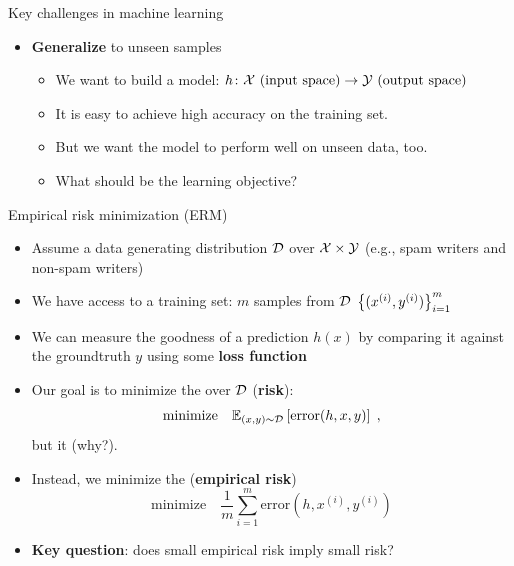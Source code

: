 \documentclass[usenames,dvipsnames,notes,11pt,aspectratio=169]{beamer}
\begin{document}
\begin{frame}
    {Key challenges in machine learning}
    \begin{itemize}
        \item \textbf{Generalize} to unseen samples
            \begin{itemize}
                \item We want to build a model: $h\colon \mathcal{X} \text{ (input space)} \rightarrow \mathcal{Y} \text{ (output space)}$
                \item It is easy to achieve high accuracy on the training set.
                \item But we want the model to perform well on unseen data, too.
                \item What should be the learning objective? 
            \end{itemize}
    \end{itemize}
\end{frame}

\begin{frame}
    {Empirical risk minimization (ERM)}

    \begin{itemize}[<+->]
        \item Assume a data generating distribution $\mathcal{D}$ over $\mathcal{X}\times\mathcal{Y}$ (e.g., spam writers and non-spam writers)
        \item We have access to a training set: $m$ samples from $\mathcal{D}$ $\left\{ (x^{(i)}, y^{(i)}) \right\}_{i=1}^m$
        \item We can measure the goodness of a prediction $h(x)$ by comparing it against the groundtruth $y$ using some \textbf{loss function}
        \item Our goal is to minimize the  over $\mathcal{D}$ (\textbf{risk}):
            $$
\text{minimize}\quad \mathbb{E}_{(x,y)\sim\mathcal{D}}\left[ \mathrm{error}(h,x,y) \right] \;,
            $$
            but it  (why?).
\item Instead, we minimize the  (\textbf{empirical risk})  %
    $$
    \text{minimize}\quad \frac{1}{m}\sum_{i=1}^m \mathrm{error}(h, x^{(i)}, y^{(i)})
    $$

\item {\bf Key question}: does small empirical risk imply small risk? 
    \end{itemize}
\end{frame}
\end{document}
